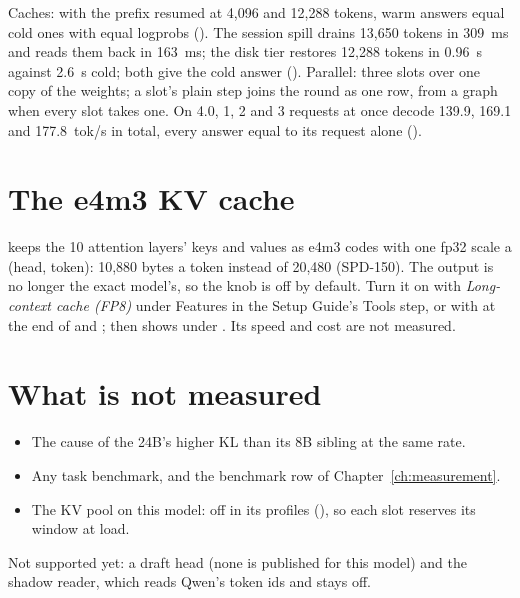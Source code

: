 Caches: with the prefix resumed at 4,096 and 12,288 tokens, warm answers equal cold ones with equal logprobs (). The session spill drains 13,650 tokens in 309~ms and reads them back in 163~ms; the disk tier restores 12,288 tokens in 0.96~s against 2.6~s cold; both give the cold answer (\measured). Parallel: three slots over one copy of the weights; a slot's plain step joins the round as one row, from a graph when every slot takes one. On 4.0, 1, 2 and 3 requests at once decode 139.9, 169.1 and 177.8~tok/s in total, every answer equal to its request alone (\measured).

\section{The e4m3 KV cache}

 keeps the 10 attention layers' keys and values as e4m3 codes with one fp32 scale a (head, token): 10,880 bytes a token instead of 20,480 (SPD-150). The output is no longer the exact model's, so the knob is off by default. Turn it on with \emph{Long-context cache (FP8)} under Features in the Setup Guide's Tools step, or with  at the end of  and ;  then shows  under . Its speed and cost are not measured.

\section{What is not measured}

\begin{itemize}
\item The cause of the 24B's higher KL than its 8B sibling at the same rate.
\item Any task benchmark, and the benchmark row of Chapter~\ref{ch:measurement}.
\item The KV pool on this model: off in its profiles (), so each slot reserves its window at load.
\end{itemize}

Not supported yet: a draft head (none is published for this model) and the shadow reader, which reads Qwen's token ids and stays off.
